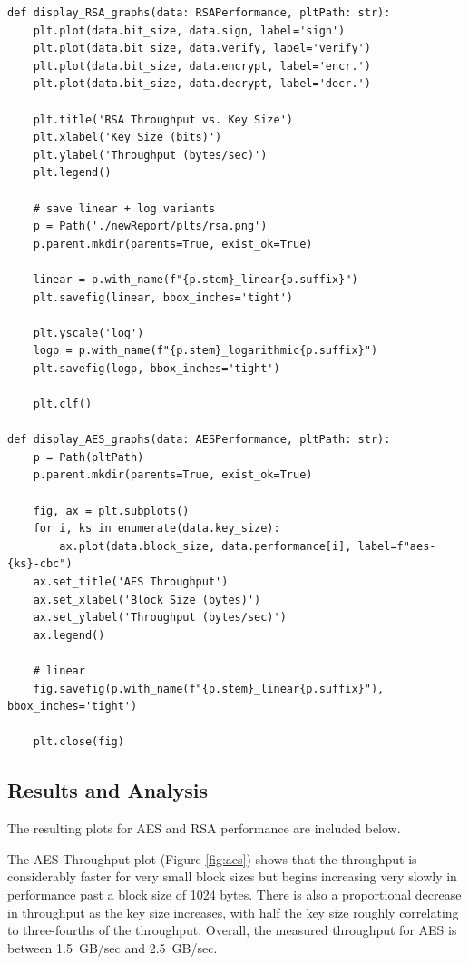 \documentclass[11pt]{article}
\begin{document}
\begin{framed}
\begin{verbatim}
def display_RSA_graphs(data: RSAPerformance, pltPath: str): 
    plt.plot(data.bit_size, data.sign, label='sign')
    plt.plot(data.bit_size, data.verify, label='verify')
    plt.plot(data.bit_size, data.encrypt, label='encr.')
    plt.plot(data.bit_size, data.decrypt, label='decr.')

    plt.title('RSA Throughput vs. Key Size')
    plt.xlabel('Key Size (bits)')
    plt.ylabel('Throughput (bytes/sec)')
    plt.legend()
       
    # save linear + log variants
    p = Path('./newReport/plts/rsa.png')
    p.parent.mkdir(parents=True, exist_ok=True)

    linear = p.with_name(f"{p.stem}_linear{p.suffix}")
    plt.savefig(linear, bbox_inches='tight')

    plt.yscale('log')
    logp = p.with_name(f"{p.stem}_logarithmic{p.suffix}")
    plt.savefig(logp, bbox_inches='tight')

    plt.clf()

def display_AES_graphs(data: AESPerformance, pltPath: str):
    p = Path(pltPath)
    p.parent.mkdir(parents=True, exist_ok=True)

    fig, ax = plt.subplots()
    for i, ks in enumerate(data.key_size):
        ax.plot(data.block_size, data.performance[i], label=f"aes-{ks}-cbc")
    ax.set_title('AES Throughput')
    ax.set_xlabel('Block Size (bytes)')
    ax.set_ylabel('Throughput (bytes/sec)')
    ax.legend()

    # linear
    fig.savefig(p.with_name(f"{p.stem}_linear{p.suffix}"), bbox_inches='tight')

    plt.close(fig)

\end{verbatim}
\end{framed}

\subsection*{Results and Analysis}

The resulting plots for AES and RSA performance are included below.

The AES Throughput plot (Figure \ref{fig:aes}) shows that the throughput is considerably faster for very small block sizes but begins increasing very slowly in performance past a block size of 1024 bytes. There is also a proportional decrease in throughput as the key size increases, with half the key size roughly correlating to three-fourths of the throughput. Overall, the measured throughput for AES is between 1.5~GB/sec and 2.5~GB/sec.
\end{document}
